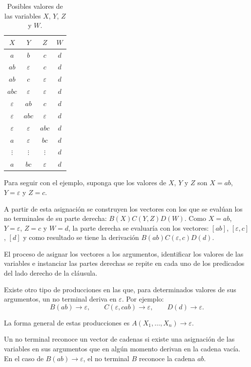 \documentclass{report}
\theoremstyle{definition}
\theoremstyle{plain}
\theoremstyle{remark}
\begin{document}
\begin{table}[ht]
  \centering
  \begin{tabular}{|c|c|c|c|}
    \hline
    $X$ & $Y$ & $Z$ & $W$ \\ \hline
    $a$ & $b$ & $c$ & $d$ \\ \hline
    $ab$ & $\varepsilon$ & $c$ & $d$ \\ \hline
    $ab$ & $c$ & $\varepsilon$ & $d$ \\ \hline
    $abc$ & $\varepsilon$ & $\varepsilon$ & $d$ \\ \hline
    $\varepsilon$ & $ab$ & $c$ & $d$ \\ \hline
    $\varepsilon$ & $abc$ & $\varepsilon$ & $d$ \\ \hline
    $\varepsilon$ & $\varepsilon$ & $abc$ & $d$ \\ \hline
    $a$ & $\varepsilon$ & $bc$ & $d$ \\ \hline
    $\vdots$ & $\vdots$ & $\vdots$ & $d$ \\ \hline
    $a$ & $bc$ & $\varepsilon$ & $d$ \\ \hline
  \end{tabular}
  \caption{Posibles valores de las variables $X$, $Y$, $Z$ y $W$.}
  \label{tab:valores-xyzw}
\end{table}

Para seguir con el ejemplo, suponga que los valores de $X$, $Y$ y $Z$
son $X = ab$, $Y = \varepsilon$ y $Z = c$.

A partir de esta asignación se construyen los vectores con los que se
evalúan los no terminales de su parte derecha: $B(X) C(Y, Z) D(W)$.
Como $X = ab$, $Y = \varepsilon$, $Z = c$ y $W = d$, la parte derecha se
evaluaría con los vectores: $[ab]$, $[\varepsilon, c]$, $[d]$ y como
resultado se tiene la derivación $B(ab) C(\varepsilon, c) D(d)$.

El proceso de asignar los vectores a los argumentos, identificar los
valores de las variables e instanciar las partes derechas se repite en
cada uno de los predicados del lado derecho de la cláusula.

Existe otro tipo de producciones en las que, para determinados valores
de sus argumentos, un no terminal deriva en $\varepsilon$. Por ejemplo:
\[
  B(ab) \to \varepsilon, \qquad
  C(\varepsilon, cab) \to \varepsilon, \qquad
  D(d) \to \varepsilon.
\]

La forma general de estas producciones es $A(X_1, \dots, X_n) \to
\varepsilon$.

Un no terminal reconoce un vector de cadenas si existe una asignación de
las variables en sus argumentos que en algún momento derivan en la
cadena vacía. En el caso de $B(ab) \to \varepsilon$, el no terminal $B$
reconoce la cadena $ab$.
\end{document}
